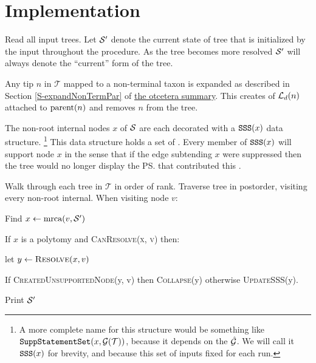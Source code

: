 \documentclass[11pt]{article}
\newcommand{\summDoc}{\href{http://phylo.bio.ku.edu/ot/summarizing-taxonomy-plus-trees.pdf}{the otcetera summary}\xspace}
\newcommand{\summRef}[1]{Section \ref{S-#1} of \summDoc}
\begin{document}
\section*{Implementation}
\begin{compactenum}
    \item Read all input trees. Let $\mathcal{S}^{\prime}$ denote the current state of tree that is initialized by the input
    \summaryTree throughout the procedure. 
    As the tree becomes more resolved $\mathcal{S}^{\prime}$ will always denote the ``current'' form of the tree.
    \item Any tip $n$ in $\mathcal{T}$ mapped to a non-terminal taxon is expanded as described in \summRef{expandNonTermPar}.
    This creates of $\mathcal{L}_d(n)$ attached to $\mbox{parent}(n)$ and removes $n$ from the tree.
    \item The non-root internal nodes $x$ of $\mathcal{S}$ are each decorated with a  $\mbox{\texttt{SSS}}(x)$ data structure.
    \footnote{A more complete name for this structure would be something like $\mbox{\texttt{SuppStatementSet}}(x, \mathcal{G}(\mathcal{T}))$,
    because it depends on the $\hat{\mathcal{G}}$.
    We will call it $\mbox{\texttt{SSS}}(x)$ for brevity, and because this set of inputs fixed for each run.}
    This data structure holds a set of  {\incLSSSs}.
    Every member of $\mbox{\texttt{SSS}}(x)$ will support node $x$ in the
    sense that if the edge subtending $x$ were suppressed then the tree would no longer 
    display the \ps that contributed this \incLSSS.
    \item Walk through each tree in $\mathcal{T}$ in order of rank. 
    Traverse tree in postorder, visiting every non-root internal.
    When visiting node $v$:
    \begin{compactenum}
        \item Find $x \leftarrow \mbox{mrca}(v, \mathcal{S}^{\prime})$
        \item If $x$ is a polytomy and \textsc{CanResolve(x, v)} then:
         \begin{compactenum}
            \item let $y\leftarrow \textsc{Resolve}(x, v)$
            \item If \textsc{CreatedUnsupportedNode}(y, v) then \textsc{Collapse}(y) otherwise \textsc{UpdateSSS}(y).
        \end{compactenum}
   \end{compactenum}
   \item Print $\mathcal{S}^{\prime}$
\end{compactenum}
\end{document}
